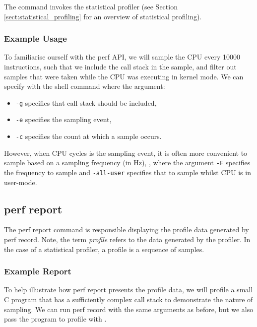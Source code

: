 The  command invokes the statistical profiler (see Section \ref{sect:statistical_profiling} for an overview of statistical profiling). 

\subsubsection{Example Usage}

To familiarise ourself with the perf API, we will sample the CPU every 10000 instructions, such that we include the call stack in the sample, and filter out samples that were taken while the CPU was executing in kernel mode. We can specify with the shell command  where the argument:
\ssp
\begin{itemize}
    \item \texttt{-g} specifies that call stack should be included,
    \item \texttt{-e} specifies the sampling event,
    \item \texttt{-c} specifies the count at which a sample occurs. 
\end{itemize}
\dsp

However, when CPU cycles is the sampling event, it is often more convenient to sample based on a sampling frequency (in Hz), , where the argument \texttt{-F} specifies the frequency to sample and \texttt{-all-user} specifies that to sample whilst CPU is in user-mode. 

\subsection{perf report}\label{sect:perf_report}

The perf report command is responsible displaying the profile data generated by perf record. Note, the term \textit{profile} refers to the data generated by the profiler. In the case of a statistical profiler, a profile is a sequence of samples.

\subsubsection{Example Report}

To help illustrate how perf report presents the profile data, we will profile a small C program that has a sufficiently complex call stack to demonstrate the nature of sampling. We can run perf record with the same arguments as before, but we also pass the program to profile with .

